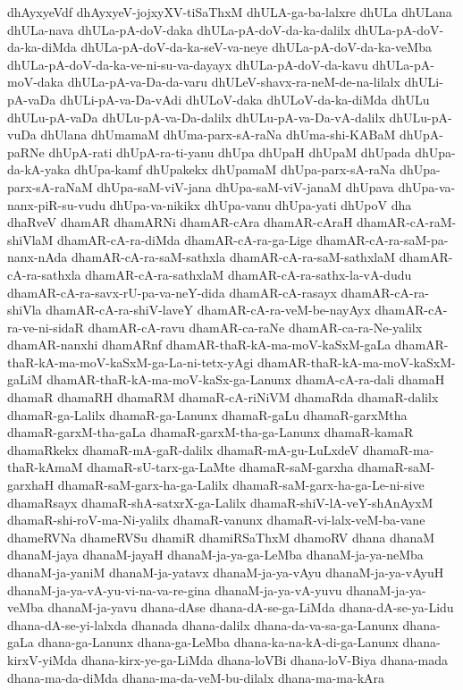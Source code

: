 {dhAyxyeVdf
dhAyxyeV-jojxyXV-tiSaThxM
dhULA-ga-ba-lalxre
dhULa
dhULana
dhULa-nava
dhULa-pA-doV-daka
dhULa-pA-doV-da-ka-dalilx
dhULa-pA-doV-da-ka-diMda
dhULa-pA-doV-da-ka-seV-va-neye
dhULa-pA-doV-da-ka-veMba
dhULa-pA-doV-da-ka-ve-ni-su-va-dayayx
dhULa-pA-doV-da-kavu
dhULa-pA-moV-daka
dhULa-pA-va-Da-da-varu
dhULeV-shavx-ra-neM-de-na-lilalx
dhULi-pA-vaDa
dhULi-pA-va-Da-vAdi
dhULoV-daka
dhULoV-da-ka-diMda
dhULu
dhULu-pA-vaDa
dhULu-pA-va-Da-dalilx
dhULu-pA-va-Da-vA-dalilx
dhULu-pA-vuDa
dhUlana
dhUmamaM
dhUma-parx-sA-raNa
dhUma-shi-KABaM
dhUpA-paRNe
dhUpA-rati
dhUpA-ra-ti-yanu
dhUpa
dhUpaH
dhUpaM
dhUpada
dhUpa-da-kA-yaka
dhUpa-kamf
dhUpakekx
dhUpamaM
dhUpa-parx-sA-raNa
dhUpa-parx-sA-raNaM
dhUpa-saM-viV-jana
dhUpa-saM-viV-janaM
dhUpava
dhUpa-va-nanx-piR-su-vudu
dhUpa-va-nikikx
dhUpa-vanu
dhUpa-yati
dhUpoV
dha
dhaRveV
dhamAR
dhamARNi
dhamAR-cAra
dhamAR-cAraH
dhamAR-cA-raM-shiVlaM
dhamAR-cA-ra-diMda
dhamAR-cA-ra-ga-Lige
dhamAR-cA-ra-saM-pa-nanx-nAda
dhamAR-cA-ra-saM-sathxla
dhamAR-cA-ra-saM-sathxlaM
dhamAR-cA-ra-sathxla
dhamAR-cA-ra-sathxlaM
dhamAR-cA-ra-sathx-la-vA-dudu
dhamAR-cA-ra-savx-rU-pa-va-neY-dida
dhamAR-cA-rasayx
dhamAR-cA-ra-shiVla
dhamAR-cA-ra-shiV-laveY
dhamAR-cA-ra-veM-be-nayAyx
dhamAR-cA-ra-ve-ni-sidaR
dhamAR-cA-ravu
dhamAR-ca-raNe
dhamAR-ca-ra-Ne-yalilx
dhamAR-nanxhi
dhamARnf
dhamAR-thaR-kA-ma-moV-kaSxM-gaLa
dhamAR-thaR-kA-ma-moV-kaSxM-ga-La-ni-tetx-yAgi
dhamAR-thaR-kA-ma-moV-kaSxM-gaLiM
dhamAR-thaR-kA-ma-moV-kaSx-ga-Lanunx
dhamA-cA-ra-dali
dhamaH
dhamaR
dhamaRH
dhamaRM
dhamaR-cA-riNiVM
dhamaRda
dhamaR-dalilx
dhamaR-ga-Lalilx
dhamaR-ga-Lanunx
dhamaR-gaLu
dhamaR-garxMtha
dhamaR-garxM-tha-gaLa
dhamaR-garxM-tha-ga-Lanunx
dhamaR-kamaR
dhamaRkekx
dhamaR-mA-gaR-dalilx
dhamaR-mA-gu-LuLxdeV
dhamaR-ma-thaR-kAmaM
dhamaR-sU-tarx-ga-LaMte
dhamaR-saM-garxha
dhamaR-saM-garxhaH
dhamaR-saM-garx-ha-ga-Lalilx
dhamaR-saM-garx-ha-ga-Le-ni-sive
dhamaRsayx
dhamaR-shA-satxrX-ga-Lalilx
dhamaR-shiV-lA-veY-shAnAyxM
dhamaR-shi-roV-ma-Ni-yalilx
dhamaR-vanunx
dhamaR-vi-lalx-veM-ba-vane
dhameRVNa
dhameRVSu
dhamiR
dhamiRSaThxM
dhamoRV
dhana
dhanaM
dhanaM-jaya
dhanaM-jayaH
dhanaM-ja-ya-ga-LeMba
dhanaM-ja-ya-neMba
dhanaM-ja-yaniM
dhanaM-ja-yatavx
dhanaM-ja-ya-vAyu
dhanaM-ja-ya-vAyuH
dhanaM-ja-ya-vA-yu-vi-na-va-re-gina
dhanaM-ja-ya-vA-yuvu
dhanaM-ja-ya-veMba
dhanaM-ja-yavu
dhana-dAse
dhana-dA-se-ga-LiMda
dhana-dA-se-ya-Lidu
dhana-dA-se-yi-lalxda
dhanada
dhana-dalilx
dhana-da-va-sa-ga-Lanunx
dhana-gaLa
dhana-ga-Lanunx
dhana-ga-LeMba
dhana-ka-na-kA-di-ga-Lanunx
dhana-kirxV-yiMda
dhana-kirx-ye-ga-LiMda
dhana-loVBi
dhana-loV-Biya
dhana-mada
dhana-ma-da-diMda
dhana-ma-da-veM-bu-dilalx
dhana-ma-ma-kAra
}
